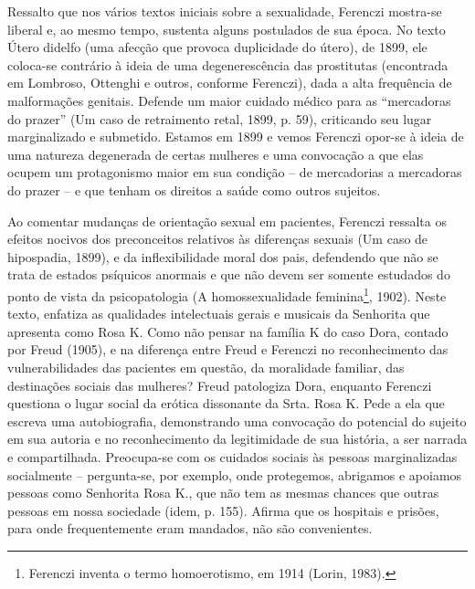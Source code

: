 Ressalto que nos vários textos iniciais sobre a sexualidade, Ferenczi
mostra-se liberal e, ao mesmo tempo, sustenta alguns postulados de sua
época. No texto Útero didelfo (uma afecção que provoca duplicidade do
útero), de 1899, ele coloca-se contrário à ideia de uma degenerescência
das prostitutas (encontrada em Lombroso, Ottenghi e outros, conforme
Ferenczi), dada a alta frequência de malformações genitais. Defende um
maior cuidado médico para as ``mercadoras do prazer'' (Um caso de
retraimento retal, 1899, p. 59), criticando seu lugar marginalizado e
submetido. Estamos em 1899 e vemos Ferenczi opor-se à ideia de uma
natureza degenerada de certas mulheres e uma convocação a que elas
ocupem um protagonismo maior em sua condição -- de mercadorias a
mercadoras do prazer -- e que tenham os direitos a saúde como outros
sujeitos.

Ao comentar mudanças de orientação sexual em pacientes, Ferenczi
ressalta os efeitos nocivos dos preconceitos relativos às diferenças
sexuais (Um caso de hipospadia, 1899), e da inflexibilidade moral dos
pais, defendendo que não se trata de estados psíquicos anormais e que
não devem ser somente estudados do ponto de vista da psicopatologia (A
homossexualidade feminina\footnote{Ferenczi inventa o termo
  homoerotismo, em 1914 (Lorin, 1983).}, 1902). Neste texto, enfatiza as
qualidades intelectuais gerais e musicais da Senhorita que apresenta
como Rosa K. Como não pensar na família K do caso Dora, contado por
Freud (1905), e na diferença entre Freud e Ferenczi no reconhecimento
das vulnerabilidades das pacientes em questão, da moralidade familiar,
das destinações sociais das mulheres? Freud patologiza Dora, enquanto
Ferenczi questiona o lugar social da erótica dissonante da Srta. Rosa K.
Pede a ela que escreva uma autobiografia, demonstrando uma convocação do
potencial do sujeito em sua autoria e no reconhecimento da legitimidade
de sua história, a ser narrada e compartilhada. Preocupa-se com os
cuidados sociais às pessoas marginalizadas socialmente -- pergunta-se,
por exemplo, onde protegemos, abrigamos e apoiamos pessoas como
Senhorita Rosa K., que não tem as mesmas chances que outras pessoas em
nossa sociedade (idem, p. 155). Afirma que os hospitais e prisões, para
onde frequentemente eram mandados, não são convenientes.


